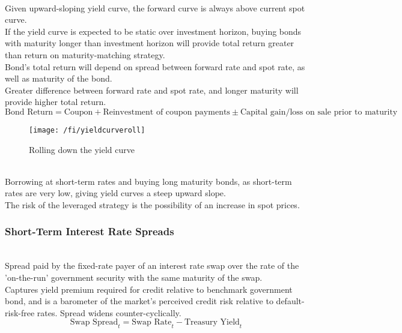 \begin{method} \\
Given upward-sloping yield curve, the forward curve is always above current spot curve.\\
If the yield curve is expected to be static over investment horizon, buying bonds with maturity longer than investment horizon will provide total return greater than return on maturity-matching strategy.\\
Bond's total return will depend on spread between forward rate and spot rate, as well as maturity of the bond.\\
Greater difference between forward rate and spot rate, and longer maturity will provide higher total return.
\begin{equation}
\text{Bond Return} = \text{Coupon} + \text{Reinvestment of coupon payments} \pm \text{Capital gain/loss on sale prior to maturity} \nonumber
\end{equation}
\end{method}

\begin{figure}[H]
\centering
\texttt{[image: /fi/yieldcurveroll]}
\caption{Rolling down the yield curve}
\end{figure}

\begin{method} \\
Borrowing at short-term rates and buying long maturity bonds, as short-term rates are very low, giving yield curves a steep upward slope.\\
The risk of the leveraged strategy is the possibility of an increase in spot prices.
\end{method}

\subsubsection{Short-Term Interest Rate Spreads}

\begin{definition} \\
Spread paid by the fixed-rate payer of an interest rate swap over the rate of the 'on-the-run' government security with the same maturity of the swap.\\
Captures yield premium required for credit relative to benchmark government bond, and is a barometer of the market's perceived credit risk relative to default-risk-free rates. Spread widens counter-cyclically.
\begin{equation}
\text{Swap Spread}_t = \text{Swap Rate}_t - \text{Treasury Yield}_t \nonumber
\end{equation}
\end{definition}

